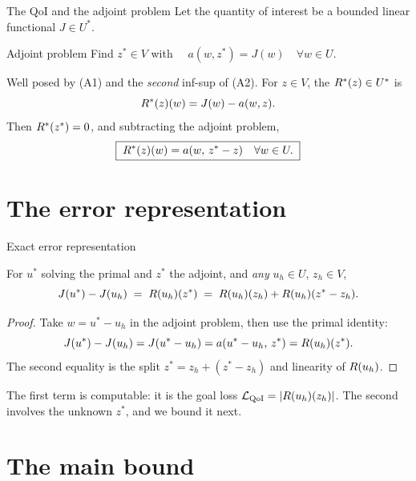 \documentclass[11pt,aspectratio=169]{beamer}
\begin{document}
\begin{frame}{The QoI and the adjoint problem}
  Let the quantity of interest be a bounded linear functional $J \in U^*$.
  \medskip
  \begin{block}{Adjoint problem}
    Find $z^* \in V$ with $\quad a(w, z^*) = J(w) \quad \forall w \in U.$
  \end{block}
  \medskip
  Well posed by (A1) and the \emph{second} inf-sup of (A2). For $z \in V$, the
   $R^{*}(z) \in U^*$ is
  \[
    R^{*}(z)(w) = J(w) - a(w, z).
  \]
  Then $R^{*}(z^*) = 0$, and subtracting the adjoint problem,
  \[
    \boxed{\;R^{*}(z)(w) = a(w,\, z^* - z) \quad \forall w \in U.\;}
  \]
\end{frame}

\section{The error representation}

\begin{frame}{Exact error representation}
  \begin{proposition}
    For $u^*$ solving the primal and $z^*$ the adjoint, and \emph{any}
    $u_h \in U$, $z_h \in V$,
    \[
      J(u^*) - J(u_h)
        \;=\; R(u_h)(z^*)
        \;=\; R(u_h)(z_h) + R(u_h)(z^* - z_h) .
    \]
  \end{proposition}
  \begin{proof}
    Take $w = u^* - u_h$ in the adjoint problem, then use the primal identity:
    \[
      J(u^*) - J(u_h) = J(u^* - u_h)
        = a(u^* - u_h,\, z^*)
        = R(u_h)(z^*).
    \]
    The second equality is the split $z^* = z_h + (z^* - z_h)$ and linearity of
    $R(u_h)$. \qedhere
  \end{proof}
  \medskip
  The first term is computable: it is the goal loss $\mathcal{L}_{\mathrm{QoI}} = |R(u_h)(z_h)|$. The
  second involves the unknown $z^*$, and we bound it next.
\end{frame}

\section{The main bound}
\end{document}
